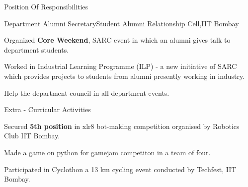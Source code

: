 \documentclass{resume_ssl}
\begin{document}
\begin{section}{Position Of Responsibilities}
	\begin{subsection}{Department Alumni Secretary}{}{Student Alumni Relationship Cell,IIT Bombay}{}
		\item Organized \textbf{Core Weekend}, SARC event in which an alumni gives talk to department students.
		\item Worked in Industrial Learning Programme (ILP) - a new initiative of SARC which provides projects to students from alumni presently working in industry.
		\item Help the department council in all department events.
	\end{subsection}
\end{section}
\vspace{3em}
\begin{section}{Extra - Curricular Activities}
	\begin{subsection}{}{}{}{}
		\item Secured \textbf{5th position} in xlr8 bot-making competition organised by Robotics Club IIT Bombay.
		\item Made a game on python for gamejam competiton in a team of four.
		\item Participated in Cyclothon a 13 km cycling event conducted by Techfest, IIT Bombay.
	\end{subsection}
\end{section}
\end{document}
